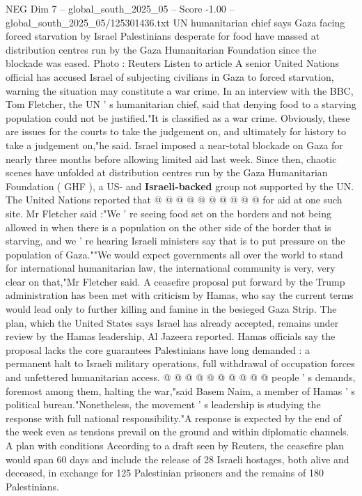 \begin{textsample}{NEG Dim 7 – global\_south\_2025\_05 – Score -1.00 – global\_south\_2025\_05/125301436.txt}  \label{ex:f7_neg_013}
UN humanitarian chief says Gaza facing forced starvation by Israel Palestinians desperate for food have massed at distribution centres run by the Gaza Humanitarian Foundation since the blockade was eased.
Photo : Reuters Listen to article A senior United Nations official has accused Israel of subjecting civilians in Gaza to forced starvation, warning the situation may constitute a war crime.
In an interview with the BBC, Tom Fletcher, the UN ' s humanitarian chief, said that denying food to a starving population could not be justified."It is classified as a war crime.
Obviously, these are issues for the courts to take the judgement on, and ultimately for history to take a judgement on,"he said.
Israel imposed a near-total blockade on Gaza for nearly three months before allowing limited aid last week.
Since then, chaotic scenes have unfolded at distribution centres run by the Gaza Humanitarian Foundation ( GHF ), a US- and \textbf{Israeli-backed} group not supported by the UN.
The United Nations reported that @ @ @ @ @ @ @ @ @ @ for aid at one such site.
Mr Fletcher said :"We ' re seeing food set on the borders and not being allowed in when there is a population on the other side of the border that is starving, and we ' re hearing Israeli ministers say that is to put pressure on the population of Gaza.""We would expect governments all over the world to stand for international humanitarian law, the international community is very, very clear on that,"Mr Fletcher said.
A ceasefire proposal put forward by the Trump administration has been met with criticism by Hamas, who say the current terms would lead only to further killing and famine in the besieged Gaza Strip.
The plan, which the United States says Israel has already accepted, remains under review by the Hamas leadership, Al Jazeera reported.
Hamas officials say the proposal lacks the core guarantees Palestinians have long demanded : a permanent halt to Israeli military operations, full withdrawal of occupation forces and unfettered humanitarian access. @ @ @ @ @ @ @ @ @ @ people ' s demands, foremost among them, halting the war,"said Basem Naim, a member of Hamas ' s political bureau."Nonetheless, the movement ' s leadership is studying the response with full national responsibility."A response is expected by the end of the week even as tensions prevail on the ground and within diplomatic channels.
A plan with conditions According to a draft seen by Reuters, the ceasefire plan would span 60 days and include the release of 28 Israeli hostages, both alive and deceased, in exchange for 125 Palestinian prisoners and the remains of 180 Palestinians.

\end{textsample}
